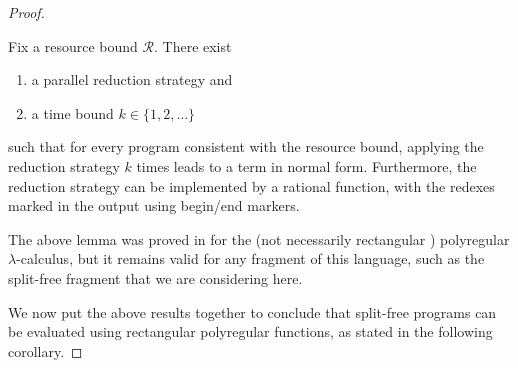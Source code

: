 \documentclass[a4paper,UKenglish,cleveref, autoref, thm-restate]{lipics-v2021}
\newcommand{\set}[1]{\{#1\}}
\newcommand{\Rr}{{\mathcal R}}
\begin{document}
\begin{proof}
    \begin{lemma} \label{lem:reduction-strategy} Fix a resource bound $\Rr$. There exist
        \begin{enumerate}
            \item a parallel reduction strategy and 
            \item a time bound $k \in \set{1,2,\ldots}$
       \end{enumerate}
       such that for every program consistent with the  resource bound, applying the reduction strategy $k$ times  leads to a term in normal form. Furthermore, the reduction strategy can be implemented by a rational function, with the redexes marked in the output using begin/end markers.
    \end{lemma}
    The above lemma was proved in \cite{bojanczykPolyregularFunctions2018} for the (not necessarily rectangular ) polyregular $\lambda$-calculus, but it remains valid for any fragment of this language, such as the split-free fragment that we are considering here. 

    We now put the above results together to conclude that split-free programs can be evaluated using rectangular polyregular functions, as stated in the following corollary.


\end{proof}
\end{document}
